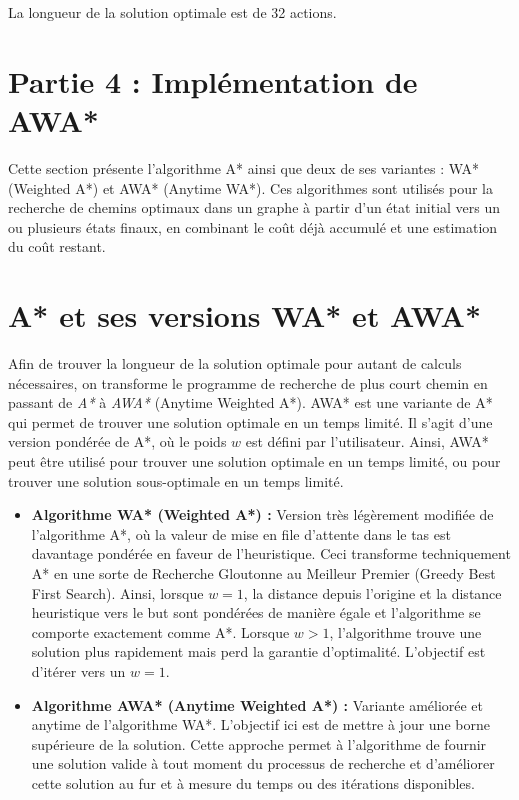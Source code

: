 La longueur de la solution optimale est de 32 actions.

\section{Partie 4 : Implémentation de AWA*}

Cette section présente l'algorithme A* ainsi que deux de ses variantes : WA* (Weighted A*) et AWA* (Anytime WA*). Ces algorithmes sont utilisés pour la recherche de chemins optimaux dans un graphe à partir d'un état initial vers un ou plusieurs états finaux, en combinant le coût déjà accumulé et une estimation du coût restant.

\section{A* et ses versions WA* et AWA*}

Afin de trouver la longueur de la solution optimale pour autant de calculs nécessaires, on transforme le programme de recherche de plus court chemin en passant de \textit{A*} à \textit{AWA*} (Anytime Weighted A*). AWA* est une variante de A* qui permet de trouver une solution optimale en un temps limité. Il s'agit d'une version pondérée de A*, où le poids $w$ est défini par l'utilisateur. Ainsi, AWA* peut être utilisé pour trouver une solution optimale en un temps limité, ou pour trouver une solution sous-optimale en un temps limité.

\begin{itemize}
    \item \textbf{Algorithme WA* (Weighted A*) :} Version très légèrement modifiée de l'algorithme A*, où la valeur de mise en file d'attente dans le tas est davantage pondérée en faveur de l'heuristique. Ceci transforme techniquement A* en une sorte de Recherche Gloutonne au Meilleur Premier (Greedy Best First Search). Ainsi, lorsque \(w = 1\), la distance depuis l'origine et la distance heuristique vers le but sont pondérées de manière égale et l'algorithme se comporte exactement comme A*. Lorsque \(w > 1\), l'algorithme trouve une solution plus rapidement mais perd la garantie d'optimalité. L'objectif est d'itérer vers un \(w = 1\).
    
    \item \textbf{Algorithme AWA* (Anytime Weighted A*) :} Variante améliorée et anytime de l'algorithme WA*. L'objectif ici est de mettre à jour une borne supérieure de la solution. Cette approche permet à l'algorithme de fournir une solution valide à tout moment du processus de recherche et d'améliorer cette solution au fur et à mesure du temps ou des itérations disponibles.
\end{itemize}

